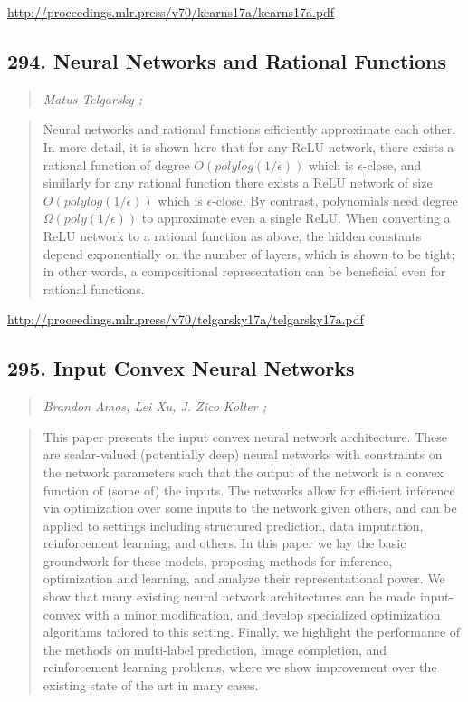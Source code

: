 \documentclass{article}
\begin{document}
\href{http://proceedings.mlr.press/v70/kearns17a/kearns17a.pdf}{http://proceedings.mlr.press/v70/kearns17a/kearns17a.pdf}

\subsection{294. Neural Networks and Rational Functions}

\begin{quote}
\footnotesize{\textit{Matus Telgarsky ;}}

\end{quote}

\begin{quote}
    Neural networks and rational functions efficiently approximate each other. In more detail, it is shown here that for any ReLU network, there exists a rational function of degree $O(polylog(1/\epsilon))$ which is $\epsilon$-close, and similarly for any rational function there exists a ReLU network of size $O(polylog(1/\epsilon))$ which is $\epsilon$-close. By contrast, polynomials need degree $\Omega(poly(1/\epsilon))$ to approximate even a single ReLU. When converting a ReLU network to a rational function as above, the hidden constants depend exponentially on the number of layers, which is shown to be tight; in other words, a compositional representation can be beneficial even for rational functions.  
\end{quote}

\href{http://proceedings.mlr.press/v70/telgarsky17a/telgarsky17a.pdf}{http://proceedings.mlr.press/v70/telgarsky17a/telgarsky17a.pdf}

\subsection{295. Input Convex Neural Networks}

\begin{quote}
\footnotesize{\textit{Brandon Amos, Lei Xu, J. Zico Kolter ;}}

\end{quote}

\begin{quote}
    This paper presents the input convex neural network architecture. These are scalar-valued (potentially deep) neural networks with constraints on the network parameters such that the output of the network is a convex function of (some of) the inputs. The networks allow for efficient inference via optimization over some inputs to the network given others, and can be applied to settings including structured prediction, data imputation, reinforcement learning, and others. In this paper we lay the basic groundwork for these models, proposing methods for inference, optimization and learning, and analyze their representational power. We show that many existing neural network architectures can be made input-convex with a minor modification, and develop specialized optimization algorithms tailored to this setting. Finally, we highlight the performance of the methods on multi-label prediction, image completion, and reinforcement learning problems, where we show improvement over the existing state of the art in many cases.  
\end{quote}
\end{document}
